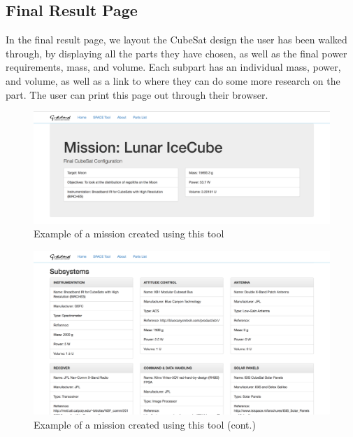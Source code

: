 \documentclass[a4, 12 pt]{article} %
\begin{document}
\subsection{Final Result Page}
In the final result page, we layout the CubeSat design the user has been walked through, by displaying all the parts they have chosen, as well as the final power requirements, mass, and volume. Each subpart has an individual mass, power, and volume, as well as a link to where they can do some more research on the part. The user can print this page out through their browser. 
\begin{figure}[H]
\begin{center}
\includegraphics[width=\linewidth]{9}
\caption{Example of a mission created using this tool}
\label{default}
\end{center}
\end{figure}
\begin{figure}[H]
\begin{center}
\includegraphics[width=\linewidth]{10}
\caption{Example of a mission created using this tool (cont.)}
\label{default}
\end{center}
\end{figure}
\end{document}
